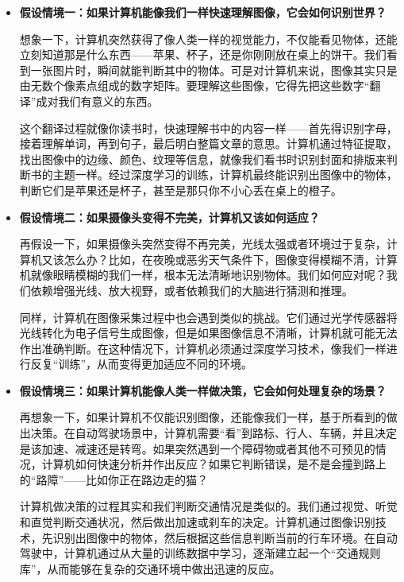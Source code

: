 \begin{itemize}
    \item \textbf{假设情境一：如果计算机能像我们一样快速理解图像，它会如何识别世界？}  

    想象一下，计算机突然获得了像人类一样的视觉能力，不仅能看见物体，还能立刻知道那是什么东西——苹果、杯子，还是你刚刚放在桌上的饼干。我们看到一张图片时，瞬间就能判断其中的物体。可是对计算机来说，图像其实只是由无数个像素点组成的数字矩阵。要理解这些图像，它得先把这些数字“翻译”成对我们有意义的东西。

    这个翻译过程就像你读书时，快速理解书中的内容一样——首先得识别字母，接着理解单词，再到句子，最后明白整篇文章的意思。计算机通过特征提取，找出图像中的边缘、颜色、纹理等信息，就像我们看书时识别封面和排版来判断书的主题一样。经过深度学习的训练，计算机最终能识别出图像中的物体，判断它们是苹果还是杯子，甚至是那只你不小心丢在桌上的橙子。

    \item \textbf{假设情境二：如果摄像头变得不完美，计算机又该如何适应？}  

    再假设一下，如果摄像头突然变得不再完美，光线太强或者环境过于复杂，计算机又该怎么办？比如，在夜晚或恶劣天气条件下，图像变得模糊不清，计算机就像眼睛模糊的我们一样，根本无法清晰地识别物体。我们如何应对呢？我们依赖增强光线、放大视野，或者依赖我们的大脑进行猜测和推理。

    同样，计算机在图像采集过程中也会遇到类似的挑战。它们通过光学传感器将光线转化为电子信号生成图像，但是如果图像信息不清晰，计算机就可能无法作出准确判断。在这种情况下，计算机必须通过深度学习技术，像我们一样进行反复“训练”，从而变得更加适应不同的环境。

    \item \textbf{假设情境三：如果计算机能像人类一样做决策，它会如何处理复杂的场景？}  

    再想象一下，如果计算机不仅能识别图像，还能像我们一样，基于所看到的做出决策。在自动驾驶场景中，计算机需要“看”到路标、行人、车辆，并且决定是该加速、减速还是转弯。如果突然遇到一个障碍物或者其他不可预见的情况，计算机如何快速分析并作出反应？如果它判断错误，是不是会撞到路上的“路障”——比如你正在路边走的猫？

    计算机做决策的过程其实和我们判断交通情况是类似的。我们通过视觉、听觉和直觉判断交通状况，然后做出加速或刹车的决定。计算机通过图像识别技术，先识别出图像中的物体，然后根据这些信息判断当前的行车环境。在自动驾驶中，计算机通过从大量的训练数据中学习，逐渐建立起一个“交通规则库”，从而能够在复杂的交通环境中做出迅速的反应。
\end{itemize}


